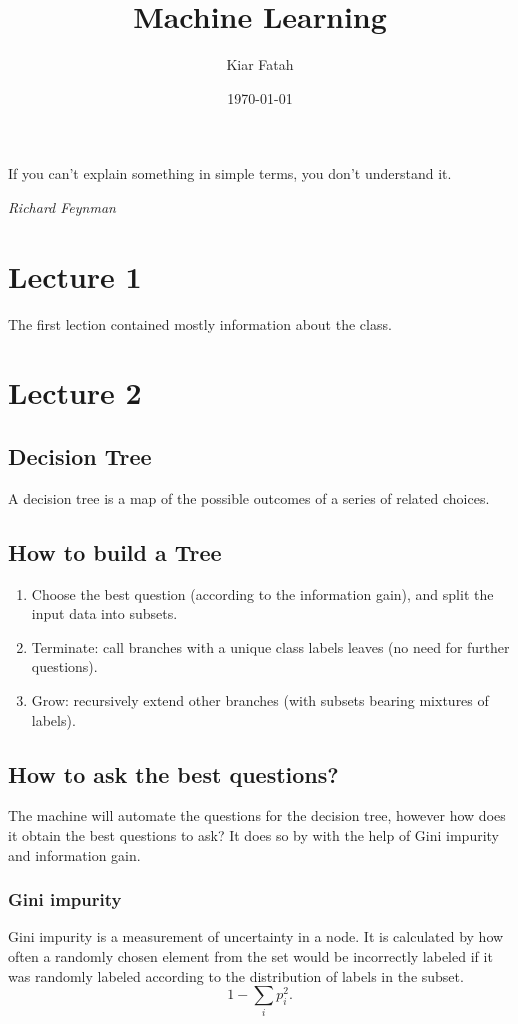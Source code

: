 \documentclass[12pt]{article}
\title{Machine Learning}
\author{Kiar Fatah}
\date{\today}
\numberwithin{equation}{section}
\begin{document}
\maketitle

\newpage

\tableofcontents 

\newpage
\epigraph{If you can’t explain something in simple terms, you don’t understand it.}{\textit{Richard Feynman }}
\newpage
\section{Lecture 1}
The first lection contained mostly information about the class.
\section{Lecture 2}
\subsection{Decision Tree}
A decision tree is a map of the possible outcomes of a series of related choices.
\subsection{How to build a Tree}
\begin{enumerate}
\item Choose the best question (according to the information
gain), and split the input data into subsets.
\item Terminate: call branches with a unique class labels leaves
(no need for further questions).
\item Grow: recursively extend other branches (with subsets bearing mixtures of labels).
\end{enumerate}

\subsection{How to ask the best questions?}
The machine will automate the questions for the decision tree, however how does it obtain the best questions to ask? It does so by with the help of Gini impurity and information gain.
\subsubsection{Gini impurity}
Gini impurity is a measurement of uncertainty in a node. It is calculated by how often a randomly chosen element from the set would be incorrectly labeled if it was randomly labeled according to the distribution of labels in the subset. 
\begin{equation}
    1 - \sum_i p_i^2.
\end{equation}
\end{document}
